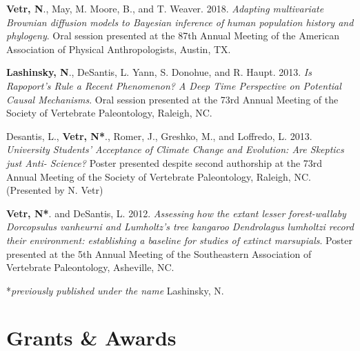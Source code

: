 \documentclass[12pt]{article}
\begin{document}
\begin{enumerate}[label={[\arabic*]}]
\item \textbf{Vetr, N}., May, M. Moore, B., and T. Weaver. 2018. \emph{Adapting multivariate Brownian diffusion models to Bayesian inference of human population history and phylogeny}. Oral session presented at the 87th Annual Meeting of the American Association of Physical Anthropologists, Austin, TX.

\item \textbf{Lashinsky, N}., DeSantis, L. Yann, S. Donohue, and R. Haupt. 2013. \emph{Is Rapoport’s Rule a Recent Phenomenon? A Deep Time Perspective on Potential Causal Mechanisms}. Oral session presented at the 73rd Annual Meeting of the Society of Vertebrate Paleontology, Raleigh, NC. 

\item Desantis, L., \textbf{Vetr, N*}., Romer, J., Greshko, M., and Loffredo, L. 2013. \emph{University Students' Acceptance of Climate Change and Evolution: Are Skeptics just Anti- Science?} Poster presented despite second authorship at the 73rd Annual Meeting of the Society of Vertebrate Paleontology, Raleigh, NC. (Presented by N. Vetr) 

\item \textbf{Vetr, N*}. and DeSantis, L. 2012. \emph{Assessing how the extant lesser forest-wallaby Dorcopsulus vanheurni and Lumholtz’s tree kangaroo Dendrolagus lumholtzi record their environment: establishing a baseline for studies of extinct marsupials}. Poster presented at the 5th Annual Meeting of the Southeastern Association of Vertebrate Paleontology, Asheville, NC. 

*\textit{previously published under the name} Lashinsky, N.\\

\end{enumerate}

\vspace{-0.35em}

\section{Grants \& Awards}
\end{document}
